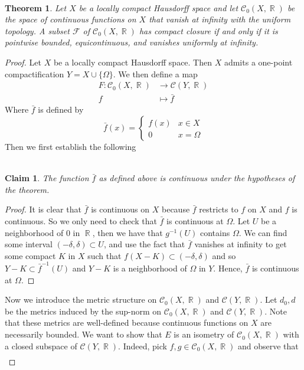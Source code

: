 \documentclass{article}
\DeclareMathOperator{\R}{\mathbb{R}}
\newcommand{\exercise}[1]{\noindent{\textbf{Exercise #1:}}}
\newtheorem*{thm}{\\ Theorem}
\newtheorem*{claim}{\\ Claim}
\begin{document}
\exercise{43.5}
\begin{thm}
  Let $X$ be a locally compact Hausdorff space and let
  $\mathcal{C}_0(X,\R)$ be the space of continuous functions on $X$
  that vanish at infinity with the uniform topology. A subset
  $\mathcal{F}$ of $\mathcal{C}_0(X,\R)$ has compact closure if and
  only if it is pointwise bounded, equicontinuous, and vanishes
  uniformly at infinity.
\end{thm}
\begin{proof}
  Let $X$ be a locally compact Hausdorff space. Then $X$ admits a
  one-point compactification $Y = X \cup \{\Omega\}$. We then define a map
  \begin{align*}
  F: \mathcal{C}_0(X,\R) &\to \mathcal{C}(Y,\R) \\
  f &\mapsto \bar{f}
  \end{align*}
  Where $\bar{f}$ is defined by
  \[
  \bar{f}(x) =
  \begin{cases}
    f(x) & x \in X \\
    0 & x = \Omega
  \end{cases}
  \]
  Then we first establish the following
  \begin{claim}
    The function $\bar{f}$ as defined above is continuous under the
    hypotheses of the theorem.
  \end{claim}
  \begin{proof}
    It is clear that $\bar{f}$ is continuous on $X$ because $\bar{f}$
    restricts to $f$ on $X$ and $f$ is continuous. So we only need to
    check that $\bar{f}$ is continuous at $\Omega$. Let $U$ be a
    neighborhood of $0$ in $\R$, then we have that $g^{-1}(U)$
    contains $\Omega$. We can find some interval $(-\delta, \delta)
    \subset U$, and use the fact that $\bar{f}$ vanishes at infinity
    to get some compact $K$ in $X$ such that $f(X - K) \subset
    (-\delta, \delta)$ and so $Y-K \subset \bar{f}^{-1}(U)$ and $Y-K$
    is a neighborhood of $\Omega$ in $Y$. Hence, $\bar{f}$ is
    continuous at $\Omega$.
  \end{proof}
  Now we introduce the metric structure on $\mathcal{C}_0(X,\R)$ and
  $\mathcal{C}(Y,\R)$. Let $d_0,d$ be the metrics induced by the
  sup-norm on $\mathcal{C}_0(X,\R)$ and $\mathcal{C}(Y, \R)$. Note
  that these metrics are well-defined because continuous functions on
  $X$ are necessarily bounded. We want to show that $E$ is an isometry
  of $\mathcal{C}_0(X,\R)$ with a closed subspace of
  $\mathcal{C}(Y,\R)$. Indeed, pick $f,g \in \mathcal{C}_0(X,\R)$ and
  observe that
  \begin{align*}

\end{align*}
\end{proof}
\end{document}
